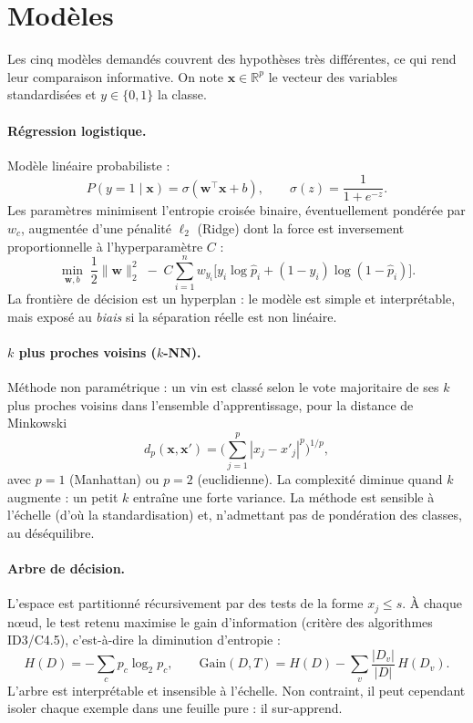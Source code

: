 \documentclass[11pt,a4paper]{article}
\begin{document}
\section{Modèles}\label{sec:modeles}

Les cinq modèles demandés couvrent des hypothèses très différentes, ce qui rend leur comparaison informative. On note $\mathbf{x}\in\mathbb{R}^{p}$ le vecteur des variables standardisées et $y\in\{0,1\}$ la classe.

\paragraph{Régression logistique.} Modèle linéaire probabiliste :
\begin{equation}
P(y=1 \mid \mathbf{x}) = \sigma(\mathbf{w}^\top\mathbf{x} + b), \qquad \sigma(z) = \frac{1}{1+e^{-z}}.
\end{equation}
Les paramètres minimisent l'entropie croisée binaire, éventuellement pondérée par $w_c$, augmentée d'une pénalité $\ell_2$ (Ridge) dont la force est inversement proportionnelle à l'hyperparamètre $C$ :
\begin{equation}
\min_{\mathbf{w},b}\; \frac{1}{2}\|\mathbf{w}\|_2^2 \;-\; C\sum_{i=1}^{n} w_{y_i}\Big[y_i\log \hat p_i + (1-y_i)\log(1-\hat p_i)\Big].
\end{equation}
La frontière de décision est un hyperplan : le modèle est simple et interprétable, mais exposé au \emph{biais} si la séparation réelle est non linéaire.

\paragraph{$k$ plus proches voisins ($k$-NN).} Méthode non paramétrique : un vin est classé selon le vote majoritaire de ses $k$ plus proches voisins dans l'ensemble d'apprentissage, pour la distance de Minkowski
\begin{equation}
d_p(\mathbf{x},\mathbf{x}') = \Big(\sum_{j=1}^{p}|x_j - x'_j|^{p}\Big)^{1/p},
\end{equation}
avec $p=1$ (Manhattan) ou $p=2$ (euclidienne). La complexité diminue quand $k$ augmente : un petit $k$ entraîne une forte variance. La méthode est sensible à l'échelle (d'où la standardisation) et, n'admettant pas de pondération des classes, au déséquilibre.

\paragraph{Arbre de décision.} L'espace est partitionné récursivement par des tests de la forme $x_j \leq s$. À chaque nœud, le test retenu maximise le gain d'information (critère des algorithmes ID3/C4.5), c'est-à-dire la diminution d'entropie :
\begin{equation}
H(D) = -\sum_{c} p_c \log_2 p_c, \qquad
\mathrm{Gain}(D, T) = H(D) - \sum_{v}\frac{|D_v|}{|D|}\,H(D_v).
\end{equation}
L'arbre est interprétable et insensible à l'échelle. Non contraint, il peut cependant isoler chaque exemple dans une feuille pure : il sur-apprend.
\end{document}
